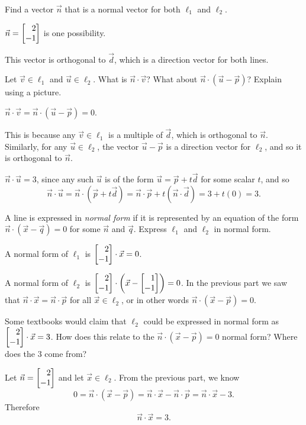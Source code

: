 \documentclass{problemset}
\begin{document}
	\begin{parts}
		\item Find a vector $\vec n$ that is a normal vector for both $\ell_1$
			and	$\ell_2$.
			\begin{solution}
				$\vec n=\mat{2\\-1}$ is one possibility.

				This vector is orthogonal to $\vec d$, which is a direction
				vector for both lines.
			\end{solution}
		\item Let $\vec v\in \ell_1$ and $\vec u\in \ell_2$.
			What is $\vec n\cdot \vec v$? What about $\vec n\cdot (\vec u-\vec p)$? Explain using a picture.
			\begin{solution}
				$\vec n\cdot \vec v =\vec n\cdot(\vec u-\vec p)= 0$.
				
				This is because any $\vec v \in \ell_1$ is a multiple
				of $\vec d$, which is orthogonal to $\vec n$. Similarly, for any $\vec u\in \ell_2$,
				the vector $\vec u-\vec p$ is a direction vector for $\ell_2$, and so it is orthogonal to $\vec n$.

				$\vec n\cdot \vec u=3$, since any such $\vec u$ is of the form
				$\vec u=\vec p+t\vec d$ for some scalar $t$, and so
				\[
					\vec n\cdot \vec u
					=\vec n\cdot (\vec p+t\vec d)
					=\vec n\cdot \vec p+t(\vec n\cdot \vec d)
					=3+t(0)
					=3.
				\]
			\end{solution}
		\item A line is expressed in \emph{normal form} if it is represented by
			an equation of the form $\vec n\cdot (\vec x-\vec q)=0$ for some
			$\vec n$ and $\vec q$. Express $\ell_1$ and $\ell_2$ in normal form.
			\begin{solution}
				A normal form of $\ell_1$ is $\mat{2\\-1}\cdot\vec x=0$.

				A normal form of $\ell_2$ is $\mat{2\\-1}\cdot\left(\vec x-\mat{1\\-1}\right)=0$.
				In the previous part we saw that $\vec n\cdot \vec x=\vec n\cdot \vec p$
				for all $\vec x\in \ell_2$, or in other words $\vec n\cdot (\vec x-\vec p) = 0$.
			\end{solution}
		\item Some textbooks would claim that $\ell_2$ could be expressed in normal form as {\color{cyan}$\mat{2\\-1}\cdot \vec x=3$}.
			How does this relate to the $\vec n\cdot(\vec x-\vec p)=0$ normal form? Where does the $3$ come from?
			\begin{solution}
				Let $\vec n=\mat{2\\-1}$ and let $\vec x\in \ell_2$. From the previous part, we know
				\[
					0=\vec n\cdot (\vec x-\vec p)
					=\vec n\cdot \vec x-\vec n\cdot \vec p
					=\vec n\cdot \vec x-3.
				\]
				Therefore
				\[
					\vec n\cdot \vec x= 3.
				\]
			\end{solution}
	\end{parts}
\end{document}
